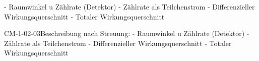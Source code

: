 - Raumwinkel u Zählrate (Detektor)
- Zählrate als Teilchenstrom
- Differenzieller Wirkungsquerschnitt
- Totaler Wirkungsquerschnitt

\begin{DEF}{CM-1-02-03}{Beschreibung nach Streuung:
- Raumwinkel u Zählrate (Detektor)
- Zählrate als Teilchenstrom
- Differenzieller Wirkungsquerschnitt
- Totaler Wirkungsquerschnitt}
\end{DEF}
